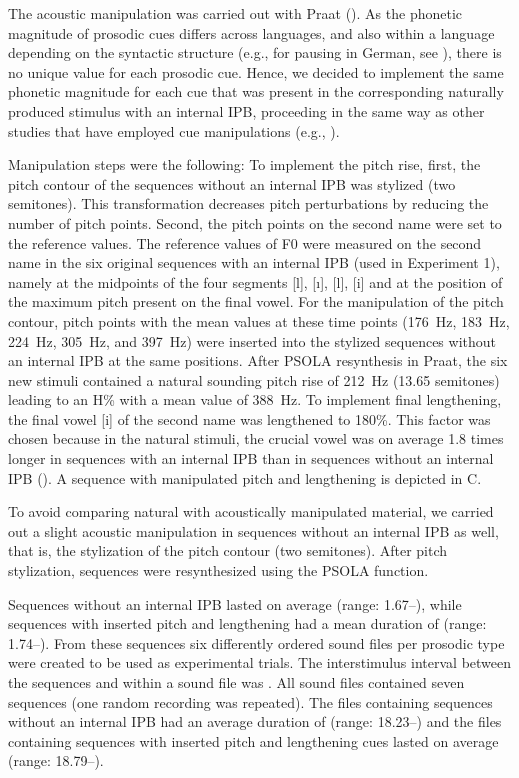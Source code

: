 \documentclass[output=paper]{langscibook}
\begin{document}
The acoustic manipulation was carried out with Praat (\citealt{Boersma2010}). As the phonetic magnitude of prosodic cues differs across languages, and also within a language depending on the syntactic structure (e.g., for pausing in German, see \citealt{Butcher1981}), there is no unique value for each prosodic cue. Hence, we decided to implement the same phonetic magnitude for each cue that was present in the corresponding naturally produced stimulus with an internal IPB, proceeding in the same way as other studies that have employed cue manipulations (e.g., \citealt{Seidl2007}).

Manipulation steps were the following: To implement the pitch rise, first, the pitch contour of the sequences without an internal IPB was stylized (two semitones). This transformation decreases pitch perturbations by reducing the number of pitch points. Second, the pitch points on the second name were set to the reference values. The reference values of F0 were measured on the second name in the six original sequences with an internal IPB (used in Experiment 1), namely at the midpoints of the four segments [l], [ı], [l], [i] and at the position of the maximum pitch present on the final vowel. For the manipulation of the pitch contour, pitch points with the mean values at these time points (\qty{176}{\hertz}, \qty{183}{\hertz}, \qty{224}{\hertz}, \qty{305}{\hertz}, and \qty{397}{\hertz}) were inserted into the stylized sequences without an internal IPB at the same positions. After PSOLA resynthesis in Praat, the six new stimuli contained a natural sounding pitch rise of \qty{212}{\hertz} (13.65 semitones) leading to an H\% with a mean value of \qty{388}{\hertz}.
To implement final lengthening, the final vowel [i] of the second name was lengthened to 180\%. This factor was chosen because in the natural stimuli, the crucial vowel was on average 1.8 times longer in sequences with an internal IPB than in sequences without an internal IPB (). A sequence with manipulated pitch and lengthening is depicted in C.

To avoid comparing natural with acoustically manipulated material, we carried out a slight acoustic manipulation in sequences without an internal IPB as well, that is, the stylization of the pitch contour (two semitones). After pitch stylization, sequences were resynthesized using the PSOLA function.

Sequences without an internal IPB lasted on average  (range: 1.67–), while sequences with inserted pitch and lengthening had a mean duration of  (range: 1.74–). From these sequences six differently ordered sound files per prosodic type were created to be used as experimental trials. The interstimulus interval between the sequences and within a sound file was . All sound files contained seven sequences (one random recording was repeated). The files containing sequences without an internal IPB had an average duration of  (range: 18.23–) and the files containing sequences with inserted pitch and lengthening cues lasted on average  (range: 18.79–).
\end{document}
